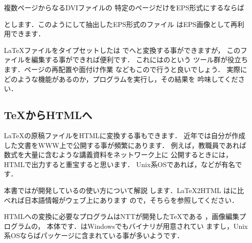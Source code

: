 \begin{Trick}
 複数ページからなるDVIファイルの
 特定のページだけをEPS形式にするならば
 \begin{InTerm}
 \end{InTerm}
 とします．このようにして抽出したEPS形式のファイル
 はEPS画像として再利用できます．
\end{Trick}

\begin{Prob}
 {\LaTeX}ファイルをタイプセットしたは
 でへと変換する事ができますが，
 この{\PS}ファイルを編集する事ができれば便利です．
 これにはのという%
 ツール群が役立ちます．ページの再配置や面付け作業
 などもこので行うと良いでしょう．
実際にどのような機能があるのか，プログラムを実行し，その結果を
吟味してください．
\end{Prob}



\subsection{\TeX からHTMLへ\zdash \texforht}

{\LaTeX}の原稿ファイルをHTMLに変換する事もできます．
近年では自分が作成した文書をWWW上で公開する事が頻繁にあります．
例えば，教職員であれば数式を大量に含むような講義資料をネットワーク上に
公開するときには，HTMLで出力すると重宝すると思います．
{Unix}系OSであれば，\Prog[TtH]{\TtH}などが有名です．

本書ではが開発している\texforht の使い方について解説
します．\LaTeX2HTML は\texforht に比べれば日本語情報がウェブ上にあります
ので，そちらを参照してください．


HTMLへの変換に必要なプログラムはNTTが開発した{\TeX}である
\prog{\JTeX}，画像編集プログラムの\Prog[ImageMagick]{\IM}，
\prog{\texforht}本体です．\prog{\IM}はWindowsでもバイナリが用意されてい
ますし，Unix系OSならばパッケージに含まれている事が多いようです．

